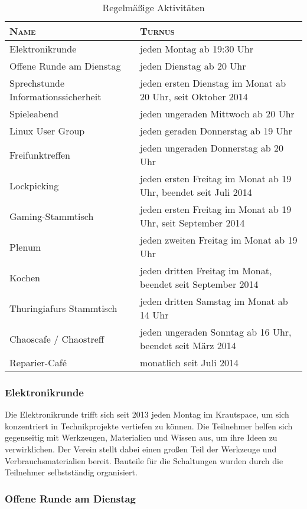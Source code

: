 \documentclass[ngerman]{scrartcl}
\begin{document}
\begin{table}[h]
  \centering{}
	\begin{tabularx}{\textwidth}{l|X}
          \toprule
		\textsc{Name} & \textsc{Turnus} \\ \midrule
		Elektronikrunde & jeden Montag ab 19:30 Uhr\\
		Offene Runde am Dienstag & jeden Dienstag ab 20 Uhr\\
		Sprechstunde Informationssicherheit & jeden ersten Dienstag im Monat ab 20 Uhr, seit Oktober 2014\\ 
		Spieleabend & jeden ungeraden Mittwoch ab 20 Uhr\\
		Linux User Group & jeden geraden Donnerstag ab 19 Uhr\\
		Freifunktreffen & jeden ungeraden Donnerstag ab 20 Uhr\\
		Lockpicking & jeden ersten Freitag im Monat ab 19 Uhr, beendet seit Juli 2014\\
		Gaming-Stammtisch & jeden ersten Freitag im Monat ab 19 Uhr, seit September 2014\\
		Plenum & jeden zweiten Freitag im Monat ab 19 Uhr\\
		Kochen & jeden dritten Freitag im Monat, beendet seit September 2014\\
		Thuringiafurs Stammtisch & jeden dritten Samstag im Monat ab 14 Uhr\\
		Chaoscafe / Chaostreff & jeden ungeraden Sonntag ab 16 Uhr, beendet seit März 2014\\
		Reparier-Café & monatlich seit Juli 2014\\
\bottomrule
\end{tabularx}
\caption{Regelmäßige Aktivitäten}
\end{table}

\subsubsection{Elektronikrunde}

Die Elektronikrunde trifft sich seit 2013 jeden Montag im Krautspace, um
sich konzentriert in Technikprojekte vertiefen zu können. Die
Teilnehmer helfen sich gegenseitig mit Werkzeugen, Materialien und
Wissen aus, um ihre Ideen zu verwirklichen. Der Verein stellt dabei
einen großen Teil der Werkzeuge und Verbrauchsmaterialien bereit.
Bauteile für die Schaltungen wurden durch die Teilnehmer selbstständig
organisiert.

\subsubsection{Offene Runde am Dienstag}
\end{document}
